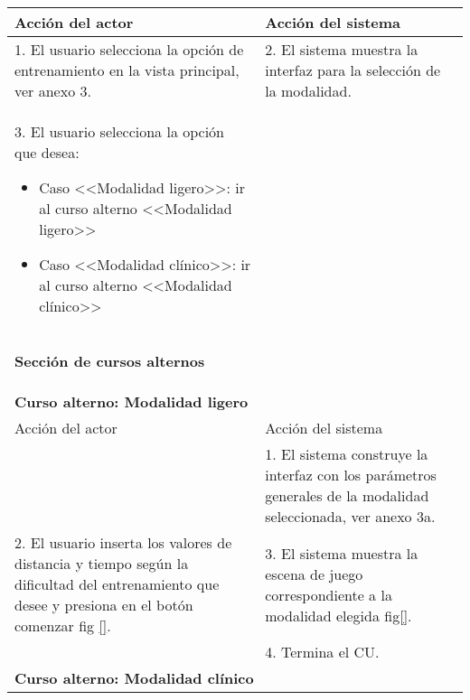 \begin{center}
\begin{table}
\begin{tabularx}{\textwidth}{|X|X|}
            Acción del actor & Acción del sistema \\\hline
            1. El usuario selecciona la opción de entrenamiento en la vista principal, ver anexo 3. & 2. El sistema muestra la interfaz para la selección de la modalidad. \\\hline
            3. El usuario selecciona la opción que desea:
            \begin{itemize}
                \item Caso <<Modalidad ligero>>: ir al curso alterno <<Modalidad ligero>>
                \item Caso <<Modalidad clínico>>: ir al curso alterno <<Modalidad clínico>>
            \end{itemize} &  \\\hline
            
            \multicolumn{2}{|X|}{        
            \begin{minipage}[t]{0.925\columnwidth}
                \begin{center}
                    \textbf{Sección de cursos alternos}
                \end{center}
            \end{minipage}} \\\hline
            \multicolumn{2}{|X|}{        
            \begin{minipage}[t]{0.925\columnwidth}
                    \textbf{Curso alterno: Modalidad ligero}
            \end{minipage}} \\\hline
            
            Acción del actor & Acción del sistema \\\hline
            
            & 
            1. El sistema construye la interfaz con los parámetros generales de la modalidad seleccionada, ver anexo 3a. \\\hline
            2. El usuario inserta los valores de distancia y tiempo según la dificultad del entrenamiento que desee y presiona en el botón comenzar fig \ref{}. 
            & 
            3. El sistema muestra la escena de juego correspondiente a la modalidad elegida fig\ref{}. \\ &4. Termina el CU. \\\hline
            
            \multicolumn{2}{|X|}{        
            \begin{minipage}[t]{0.925\columnwidth}
                    \textbf{Curso alterno: Modalidad clínico}
            \end{minipage}} \\\hline
            

\end{tabularx}
\end{table}
\end{center}
